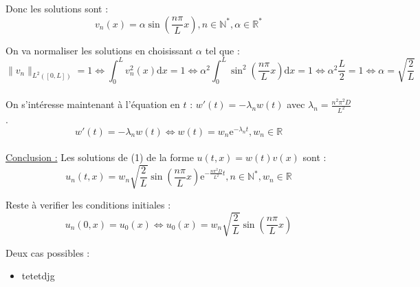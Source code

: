 \documentclass[12pt,a4paper]{article}
\begin{document}
\begin{enumerate}
\begin{itemize}
        Donc les solutions sont :
        \begin{equation}
            v_n(x) = \alpha \sin\left(\frac{n\pi}{L} x\right), n \in \mathbb{N}^*, \alpha \in \mathbb{R}^*
        \end{equation}
    \end{itemize}

    On va normaliser les solutions en choisissant $\alpha$ tel que :
    $$
    \|v_n\|_{L^2([0, L])} = 1
    \Leftrightarrow
    \int_0^L v_n^2(x) \mathrm{d}x = 1
    \Leftrightarrow
    \alpha^2 \int_0^L \sin^2\left(\frac{n\pi}{L} x\right) \mathrm{d}x = 1
    \Leftrightarrow
    \alpha^2 \frac{L}{2} = 1
    \Leftrightarrow
    \alpha = \sqrt{\frac{2}{L}}
    $$\\

    On s'intéresse maintenant à l'équation en $t$ : $w'(t) = -\lambda_n w(t)$ avec $\lambda_n = \frac{n^2 \pi^2 D}{L^2}$.
    $$
    w'(t) = -\lambda_n w(t)
    \Leftrightarrow
    w(t) = w_n \mathrm{e}^{-\lambda_n t}, w_n \in \mathbb{R}
    $$\\

    \underline{Conclusion :} Les solutions de (1) de la forme $u(t, x) = w(t)v(x)$ sont :
    \begin{equation}
        u_n(t, x) = w_n \sqrt{\frac{2}{L}} \sin\left(\frac{n\pi}{L} x\right) \mathrm{e}^{-\frac{n \pi^2 D}{L^2} t}, n \in \mathbb{N}^*, w_n \in \mathbb{R}
    \end{equation}

    Reste à verifier les conditions initiales :
    $$
    u_n(0, x) = u_0(x)
    \Leftrightarrow
    u_0(x) = w_n \sqrt{\frac{2}{L}} \sin\left(\frac{n\pi}{L} x\right)
    $$

    Deux cas possibles :
    \begin{itemize}
        \item tetetdjg
    \end{itemize}




    
\end{enumerate}
\end{document}
